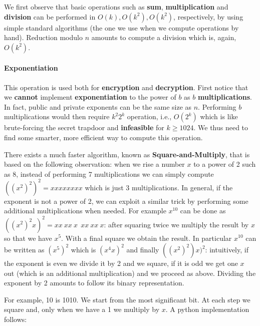 We first observe that basic operations such as \textbf{sum}, \textbf{multiplication} and \textbf{division} can be performed in $O(k), O(k^2), O(k^2)$, respectively, by using simple standard algorithms (the one we use when we compute operations by hand). Reduction modulo $n$ amounts to compute a division which is, again, $O(k^2)$.

\paragraph{Exponentiation}
This operation is used both for \textbf{encryption} and \textbf{decryption}. First notice that we \textbf{cannot} implement \textbf{exponentiation} to the power of $b$ as $b$ \textbf{multiplications}. In fact, public and private exponents can be the same size as $n$. Performing $b$ multiplications would then require $k^2 2^k$ operation, i.e., $O(2^k)$ which is like brute-forcing the secret trapdoor and \textbf{infeasible} for $k \geq 1024$. We thus need to find some smarter, more efficient way to compute this operation.

There exists a much faster algorithm, known as \textbf{Square-and-Multiply}, that is based on the following observation: when we rise a number $x$ to a power of 2 such as 8, instead of performing 7 multiplications we can simply compute $((x^2)^2)^2 = xxxxxxxx$ which is just 3 multiplications. In general, if the exponent is not a power of 2, we can exploit a similar trick by performing some additional multiplications when needed. For example $x^{10}$ can be done as $((x^2)^2 x )^2 = xx \ xx \ x \ \ xx \ xx \ x$: after squaring twice we multiply the result by $x$ so that we have $x^5$. With a final square we obtain the result. In particular $x^{10}$ can be written as $(x^{5})^2$ which is $(x^{4}x)^2$ and finally $((x^2)^2) x)^2$: intuitively, if the exponent is even we divide it by 2 and we square, if it is odd we get one $x$ out (which is an additional multiplication) and we proceed as above. Dividing the exponent by 2 amounts to follow its binary representation.

For example, 10 is 1010. We start from the most significant bit. At each step we square and, only when we have a 1 we multiply by $x$. A python implementation follows:



